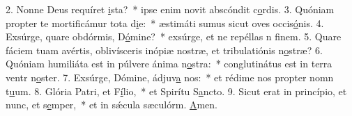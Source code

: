 2. Nonne Deus requíret \uline{i}sta?~* ipse enim novit abscóndit c\uline{o}rdis.
3. Quóniam propter te mortificámur tota d\uline{i}e:~* æstimáti sumus sicut oves occis\uline{ó}nis.
4. Exsúrge, quare obdórmis, D\uline{ó}mine?~* exsúrge, et ne repéllas n f\uline{i}nem.
5. Quare fáciem tuam avértis, oblivísceris inópiæ nostræ, et tribulatiónis n\uline{o}stræ?
6. Quóniam humiliáta est in púlvere ánima n\uline{o}stra:~* conglutinátus est in terra ventr n\uline{o}ster.
7. Exsúrge, Dómine, ádjuv\uline{a} nos:~* et rédime nos propter nomn t\uline{u}um.
8. Glória Patri, et F\uline{í}lio,~* et Spirítu S\uline{a}ncto.
9. Sicut erat in princípio, et nunc, et s\uline{e}mper,~* et in sǽcula sæculórm. \uline{A}men.
